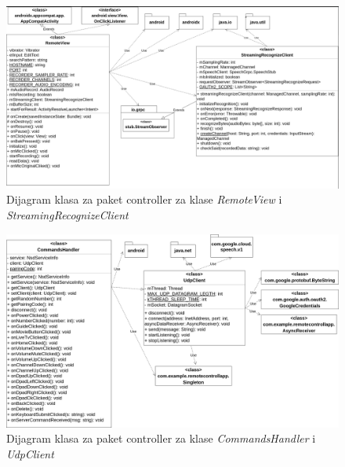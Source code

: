 \documentclass[implementacija.tex]{subfiles}
\begin{document}
\begin{figure}
    \centering
    \includegraphics[width=\textheight]{Implementacija/dijagrami/package_controller_remote_recognize.png.png}
   \caption{Dijagram klasa za paket controller za klase \textit{RemoteView} i \textit{StreamingRecognizeClient}}
  \label{fig:dijagramController1}
\end{figure}


\begin{figure}
    \centering
    \includegraphics[width=\textheight]{Implementacija/dijagrami/controller_package_handler.png}
  \caption{Dijagram klasa za paket controller za klase \textit{CommandsHandler} i \textit{UdpClient}}
  \label{fig:dijagramController2}
\end{figure}
\end{document}
